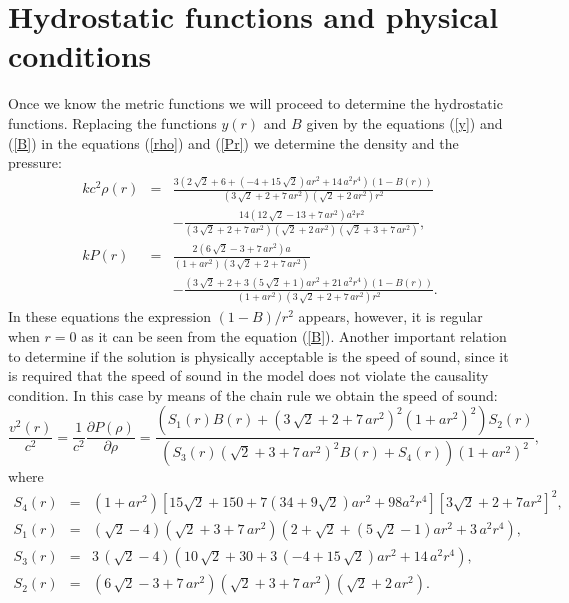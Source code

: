 \documentclass[12pt,onecolumn,a4paper]{article}
\begin{document}
\section{Hydrostatic functions and physical conditions}
\label{seccion3}
Once we know the metric functions we will proceed to determine the hydrostatic functions. Replacing the functions $y(r)$ and $B$ given by the equations (\ref{y}) and (\ref{B}) in the equations (\ref{rho}) and (\ref{Pr}) we determine the density and the pressure:
\begin{eqnarray}
k{c}^{2}\rho \left( r \right) &=& {\frac { 3\left( 2\,\sqrt {2}+6+
 \left( -4+15\,\sqrt {2} \right) a{r}^{2}+14\,{a}^{2}{r}^{4} \right) 
 \left( 1-B \left( r \right)  \right) }{ \left( 3\,\sqrt {2}+2+7\,a{r}
^{2} \right)  \left( \sqrt {2}+2\,a{r}^{2} \right) {r}^{2}}}
\nonumber\\
&&-{
\frac { 14\left( 12\,\sqrt {2}-13+7\,a{r}^{2} \right) {a}^{2}{r}^{2}}{
 \left( 3\,\sqrt {2}+2+7\,a{r}^{2} \right)  \left( \sqrt {2}+2\,a{r}^{
2} \right)  \left( \sqrt {2}+3+7\,a{r}^{2} \right) }},
 \\
kP(r) &=& {\frac { 2\left( 6\,\sqrt {2}-3+7\,a{r}^{2}
 \right) a}{ \left( 1+a{r}^{2} \right)  \left( 3\,\sqrt {2}+2+7\,a{r}^
{2} \right) }}
\nonumber\\
&&
-{\frac { \left( 3\,\sqrt {2}+2+3\, \left( 5\,\sqrt {2}+
1 \right) a{r}^{2}+21\,{a}^{2}{r}^{4} \right)  \left( 1-B \left( r
 \right)  \right) }{ \left( 1+a{r}^{2} \right)  \left( 3\,\sqrt {2}+2+
7\,a{r}^{2} \right) {r}^{2}}}.
\label{Pfinal}
\end{eqnarray}
In these equations the expression $(1-B)/r^2$ appears, however, it is regular when $r=0$ as it can be seen from the equation (\ref{B}). Another important relation to determine if the solution is physically acceptable is the speed of sound, since it is required that the speed of sound in the model does not violate the causality condition. In this case by means of the chain rule we obtain the speed of sound: 
$$
\frac{v^2(r)}{c^2}=\frac{1}{c^2}\frac{\partial P(\rho)}{\partial \rho}={\frac {
 \left( S_{{1}} \left( r \right) B \left( r \right) + \left( 3\,\sqrt 
{2}+2+7\,a{r}^{2} \right) ^{2} \left( 1+a{r}^{2} \right) ^{2} \right) 
S_{{2}} \left( r \right) }{ \left( S_{{3}} \left( r \right)  \left( 
\sqrt {2}+3+7\,a{r}^{2} \right) ^{2}B \left( r \right) +S_{{4}}
 \left( r \right)  \right)  \left( 1+a{r}^{2} \right) ^{2}}},
$$
where 
\begin{eqnarray}
S_{{4}} (r)&=&( 1+a{r}^{2} )  \left[ 15\sqrt {2}+150+7( 34+9\sqrt {2}) a{r}^{2}+98{a}^{2}{r}^{4} \right] \left[3\sqrt {2}+2+7a{r}^{2} \right] ^{2}\!,\nonumber \\
S_{{1}} (r)&=& \left( \sqrt {2}-4 \right)  \left( \sqrt {2
}+3+7\,a{r}^{2} \right)  \left( 2+\sqrt {2}+ \left( 5\,\sqrt {2}-1
 \right) a{r}^{2}+3\,{a}^{2}{r}^{4} \right) ,\nonumber \\
S_{{3}} (r)&=&3\, \left( \sqrt {2}-4 \right)  \left( 10\,
\sqrt {2}+30+3\, \left( -4+15\,\sqrt {2} \right) a{r}^{2}+14\,{a}^{2}{
r}^{4} \right) ,\nonumber \\
S_{{2}} (r)&=& \left( 6\,\sqrt {2}-3+7\,a{r}^{2} \right) 
 \left( \sqrt {2}+3+7\,a{r}^{2} \right)  \left( \sqrt {2}+2\,a{r}^{2}
 \right) .\nonumber 
 \end{eqnarray}
\end{document}
